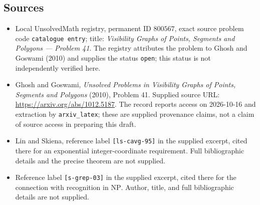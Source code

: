 \documentclass[11pt]{article}
\begin{document}
\subsection{Sources}
\begin{itemize}
\item Local UnsolvedMath registry, permanent ID \(800567\), exact source problem code \texttt{catalogue entry}; title: \emph{Visibility Graphs of Points, Segments and Polygons --- Problem 41}. The registry attributes the problem to Ghosh and Goswami (2010) and supplies the status \texttt{open}; this status is not independently verified here.
\item Ghosh and Goswami, \emph{Unsolved Problems in Visibility Graphs of Points, Segments and Polygons} (2010), Problem 41. Supplied source URL: \url{https://arxiv.org/abs/1012.5187}. The record reports access on 2026-10-16 and extraction by \texttt{arxiv\_latex}; these are supplied provenance claims, not a claim of source access in preparing this draft.
\item Lin and Skiena, reference label \texttt{[ls-cavg-95]} in the supplied excerpt, cited there for an exponential integer-coordinate requirement. Full bibliographic details and the precise theorem are not supplied.
\item Reference label \texttt{[s-grep-03]} in the supplied excerpt, cited there for the connection with recognition in \(\mathrm{NP}\). Author, title, and full bibliographic details are not supplied.
\end{itemize}
\end{document}
